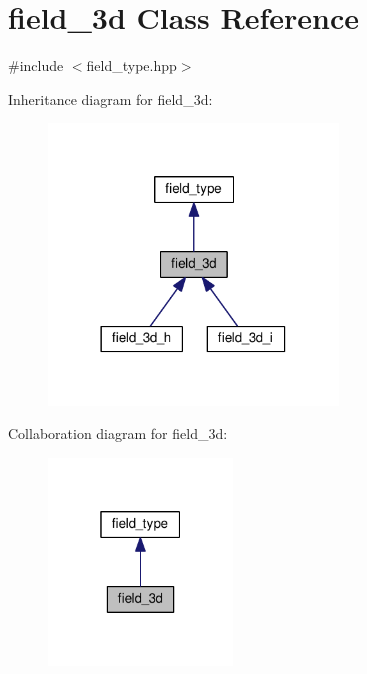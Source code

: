\hypertarget{classfield__3d}{}\section{field\+\_\+3d Class Reference}
\label{classfield__3d}


{\ttfamily \#include $<$field\+\_\+type.\+hpp$>$}



Inheritance diagram for field\+\_\+3d\+:\nopagebreak
\begin{figure}[H]
\begin{center}
\leavevmode
\includegraphics[width=218pt]{d0/d2b/classfield__3d__inherit__graph}
\end{center}
\end{figure}


Collaboration diagram for field\+\_\+3d\+:\nopagebreak
\begin{figure}[H]
\begin{center}
\leavevmode
\includegraphics[width=139pt]{d0/d96/classfield__3d__coll__graph}
\end{center}
\end{figure}
